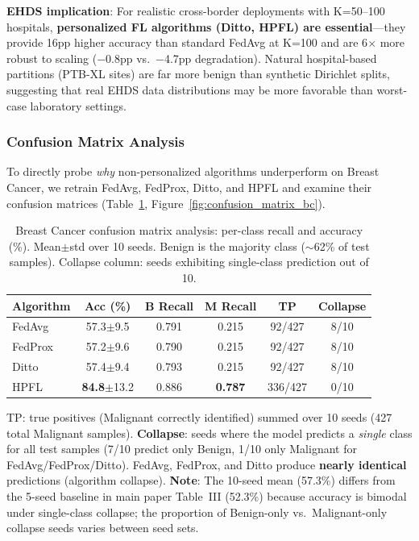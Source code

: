 \documentclass[conference]{IEEEtran}
\begin{document}
\textbf{EHDS implication}: For realistic cross-border deployments with K=50--100 hospitals, \textbf{personalized FL algorithms (Ditto, HPFL) are essential}---they provide 16pp higher accuracy than standard FedAvg at K=100 and are 6$\times$ more robust to scaling ($-$0.8pp vs.\ $-$4.7pp degradation). Natural hospital-based partitions (PTB-XL sites) are far more benign than synthetic Dirichlet splits, suggesting that real EHDS data distributions may be more favorable than worst-case laboratory settings.

\subsubsection{Confusion Matrix Analysis}
\label{sec:confusion_matrix}

To directly probe \textit{why} non-personalized algorithms underperform on Breast Cancer, we retrain FedAvg, FedProx, Ditto, and HPFL and examine their confusion matrices (Table~\ref{tab:confusion_matrix_bc}, Figure~\ref{fig:confusion_matrix_bc}).

\begin{table}[htbp]
\centering
\caption{Breast Cancer confusion matrix analysis: per-class recall and accuracy (\%). Mean$\pm$std over 10 seeds. Benign is the majority class ($\sim$62\% of test samples). Collapse column: seeds exhibiting single-class prediction out of 10.}
\label{tab:confusion_matrix_bc}
\small
\begin{tabular}{lccccc}
\toprule
\textbf{Algorithm} & \textbf{Acc (\%)} & \textbf{B Recall} & \textbf{M Recall} & \textbf{TP} & \textbf{Collapse} \\
\midrule
FedAvg & 57.3{\tiny$\pm$9.5} & 0.791 & 0.215 & 92/427 & 8/10 \\
FedProx & 57.2{\tiny$\pm$9.6} & 0.790 & 0.215 & 92/427 & 8/10 \\
Ditto & 57.4{\tiny$\pm$9.4} & 0.793 & 0.215 & 92/427 & 8/10 \\
\midrule
HPFL & \textbf{84.8}{\tiny$\pm$13.2} & 0.886 & \textbf{0.787} & 336/427 & 0/10 \\
\bottomrule
\end{tabular}

\vspace{1mm}
\footnotesize{TP: true positives (Malignant correctly identified) summed over 10 seeds (427 total Malignant samples). \textbf{Collapse}: seeds where the model predicts a \textit{single} class for all test samples (7/10 predict only Benign, 1/10 only Malignant for FedAvg/FedProx/Ditto). FedAvg, FedProx, and Ditto produce \textbf{nearly identical} predictions (algorithm collapse). \textbf{Note}: The 10-seed mean (57.3\%) differs from the 5-seed baseline in main paper Table~III (52.3\%) because accuracy is bimodal under single-class collapse; the proportion of Benign-only vs.\ Malignant-only collapse seeds varies between seed sets.}
\end{table}
\end{document}
